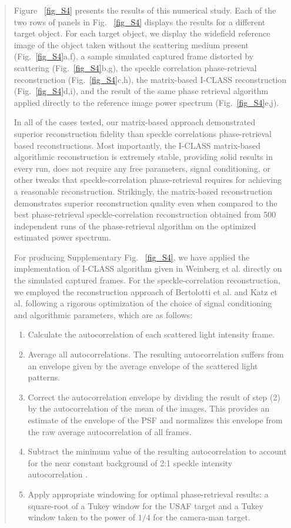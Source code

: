 \documentclass[12pt]{article}
\newenvironment{ourresponse}
    {\begin{tcolorbox}[width=\linewidth,breakable,enhanced,colback=gray!5,colframe=responsecolor!50,title=Response,left=5pt,right=5pt]}
    {\end{tcolorbox}}
\begin{document}
\begin{ourresponse}
\begin{quote}
        Figure ~\ref{fig_S4} presents the results of this numerical study. Each of the two rows of panels in Fig. ~\ref{fig_S4} displays the results for a different target object.  For each target object, we display the widefield reference image of the object taken without the scattering medium present (Fig.~\ref{fig_S4}a,f), a sample simulated captured frame distorted by scattering (Fig.~\ref{fig_S4}b,g), the speckle correlation phase-retrieval reconstruction (Fig.~\ref{fig_S4}c,h), the matrix-based I-CLASS reconstruction (Fig.~\ref{fig_S4}d,i), and the result of the same phase retrieval algorithm applied directly to the reference image power spectrum (Fig.~\ref{fig_S4}e,j).
        
        In all of the cases tested, our matrix-based approach demonstrated superior reconstruction fidelity than speckle correlations phase-retrieval based reconstructions. Most importantly, the I-CLASS matrix-based algorithmic reconstruction is extremely stable, providing solid results in every run, does not require any free parameters, signal conditioning, or other tweaks that speckle-correlation phase-retrieval requires for achieving a reasonable reconstruction. Strikingly, the matrix-based reconstruction demonstrates superior reconstruction quality even when compared to the best phase-retrieval speckle-correlation reconstruction obtained from 500 independent runs of the phase-retrieval algorithm on the optimized estimated power spectrum.
        
        For producing Supplementary Fig. ~\ref{fig_S4}, we have applied the implementation of I-CLASS algorithm given in Weinberg et al.\cite{weinberg2024noninvasive} directly on the simulated captured frames.
        For the speckle-correlation reconstruction, we employed the reconstruction approach of Bertolotti et al. and Katz et al. \cite{bert12, katz14} following a rigorous optimization of the choice of signal conditioning and algorithmic parameters, which are as follows:
        \begin{enumerate}
            \item Calculate the autocorrelation of each scattered light intensity frame.
            \item Average all autocorrelations. The resulting autocorrelation suffers from an envelope given by the average envelope of the scattered light patterns.
            \item Correct the autocorrelation envelope by dividing the result of step (2) by the autocorrelation of the mean of the images. This provides an estimate of the envelope of the PSF and normalizes this envelope from the raw average autocorrelation of all frames.
            \item Subtract the minimum value of the resulting autocorrelation to account for the near constant background of 2:1 speckle intensity autocorrelation \cite{katz14}.
            \item Apply appropriate windowing for optimal phase-retrieval results: a square-root of a Tukey window for the USAF target and a Tukey window taken to the power of $1/4$  for the camera-man target.
        \end{enumerate}
        

\end{quote}
\end{ourresponse}
\end{document}
